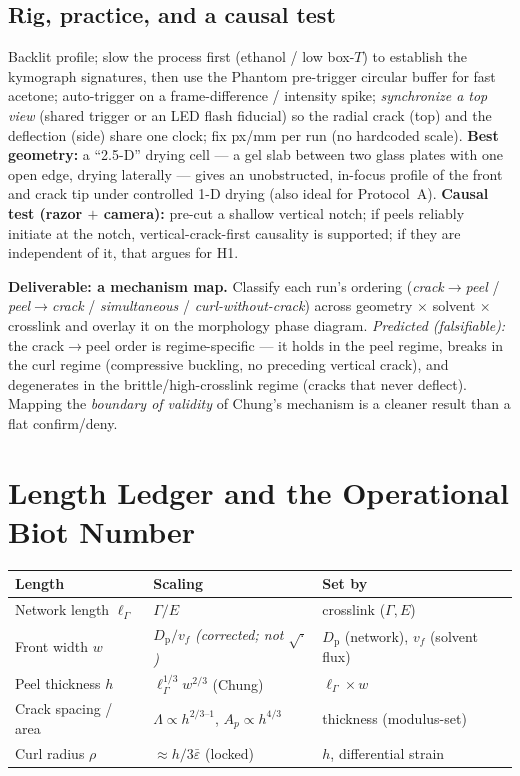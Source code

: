 \documentclass[12pt,letterpaper]{article}
\newcommand{\Gfrac}{\Gamma}
\newcommand{\Emod}{E}
\newcommand{\lG}{\ell_{\Gfrac}}          %
\newcommand{\Dp}{D_{\mathrm{p}}}
\begin{document}
\subsection{Rig, practice, and a causal test}
Backlit profile; slow the process first (ethanol / low box-$T$) to establish the
kymograph signatures, then use the Phantom pre-trigger circular buffer for fast
acetone; auto-trigger on a frame-difference / intensity spike; \emph{synchronize
a top view} (shared trigger or an LED flash fiducial) so the radial crack (top)
and the deflection (side) share one clock; fix px/mm per run (no hardcoded
scale). \textbf{Best geometry:} a ``2.5-D'' drying cell --- a gel slab between two
glass plates with one open edge, drying laterally --- gives an unobstructed,
in-focus profile of the front and crack tip under controlled 1-D drying (also
ideal for Protocol~A). \textbf{Causal test (razor $+$ camera):} pre-cut a shallow
vertical notch; if peels reliably initiate at the notch, vertical-crack-first
causality is supported; if they are independent of it, that argues for H1.

\begin{gapbox}
\textbf{Deliverable: a mechanism map.} Classify each run's ordering
(\emph{crack}$\to$\emph{peel} / \emph{peel}$\to$\emph{crack} / \emph{simultaneous}
/ \emph{curl-without-crack}) across geometry $\times$ solvent $\times$ crosslink
and overlay it on the morphology phase diagram. \emph{Predicted (falsifiable):}
the crack$\to$peel order is regime-specific --- it holds in the peel regime,
breaks in the curl regime (compressive buckling, no preceding vertical crack),
and degenerates in the brittle/high-crosslink regime (cracks that never deflect).
Mapping the \emph{boundary of validity} of Chung's mechanism is a cleaner result
than a flat confirm/deny.
\end{gapbox}

\section{Length Ledger and the Operational Biot Number}
\label{sec:biot}
\begin{center}\small
\begin{tabular}{@{}p{3.3cm}p{4.6cm}p{5.4cm}@{}}
\toprule
Length & Scaling & Set by \\
\midrule
Network length $\lG$ & $\Gfrac/\Emod$ & crosslink ($\Gfrac,\Emod$) \\
Front width $w$ & $\Dp/v_f$ \emph{(corrected; not $\sqrt{\cdot}$)} & $\Dp$
(network), $v_f$ (solvent flux) \\
Peel thickness $h$ & $\lG^{1/3}w^{2/3}$ (Chung) & $\lG\times w$ \\
Crack spacing / area & $\Lambda\propto h^{2/3\text{--}1}$, $A_p\propto h^{4/3}$ &
thickness (modulus-set) \\
Curl radius $\rho$ & $\approx h/3\bar\varepsilon$ (locked) & $h$, differential
strain \\
\bottomrule
\end{tabular}
\end{center}
\end{document}
